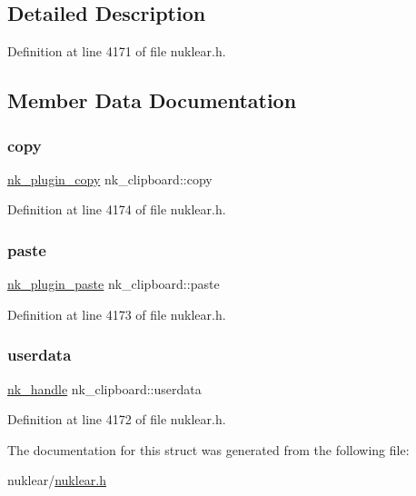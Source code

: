 \subsection{Detailed Description}


Definition at line 4171 of file nuklear.\+h.



\subsection{Member Data Documentation}
\mbox{\label{structnk__clipboard_a3fa8f2ea1924acce4456e714f575ddb4}} 
\subsubsection{\texorpdfstring{copy}{copy}}
{\footnotesize\ttfamily \mbox{\hyperlink{nuklear_8h_a01c2d0f210146bddb18fd3f4a5a9ec86}{nk\+\_\+plugin\+\_\+copy}} nk\+\_\+clipboard\+::copy}



Definition at line 4174 of file nuklear.\+h.

\mbox{\label{structnk__clipboard_ac3224d9fcbceaed96f4c5740cd76797d}} 
\subsubsection{\texorpdfstring{paste}{paste}}
{\footnotesize\ttfamily \mbox{\hyperlink{nuklear_8h_a5c2f97ddb60956a8743b9f0a8cc5e813}{nk\+\_\+plugin\+\_\+paste}} nk\+\_\+clipboard\+::paste}



Definition at line 4173 of file nuklear.\+h.

\mbox{\label{structnk__clipboard_a40e1bfd251716852fe3fa3f6856aeb2c}} 
\subsubsection{\texorpdfstring{userdata}{userdata}}
{\footnotesize\ttfamily \mbox{\hyperlink{unionnk__handle}{nk\+\_\+handle}} nk\+\_\+clipboard\+::userdata}



Definition at line 4172 of file nuklear.\+h.



The documentation for this struct was generated from the following file\+:\begin{DoxyCompactItemize}
\item 
nuklear/\mbox{\hyperlink{nuklear_8h}{nuklear.\+h}}\end{DoxyCompactItemize}
